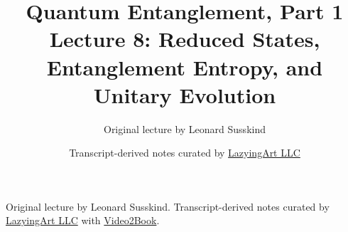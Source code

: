 \documentclass[11pt,oneside]{book}
\begin{document}
\frontmatter
\title{Quantum Entanglement, Part 1\\Lecture 8: Reduced States, Entanglement Entropy, and Unitary Evolution}
\author{Original lecture by Leonard Susskind}
\date{Transcript-derived notes curated by \href{https://lazying.art}{LazyingArt LLC}}
\maketitle
\begin{center}
\small Original lecture by Leonard Susskind. Transcript-derived notes curated by \href{https://lazying.art}{LazyingArt LLC} with \href{https://github.com/lachlanchen/Video2Book}{Video2Book}.
\end{center}
\clearpage
\mainmatter

\end{document}
